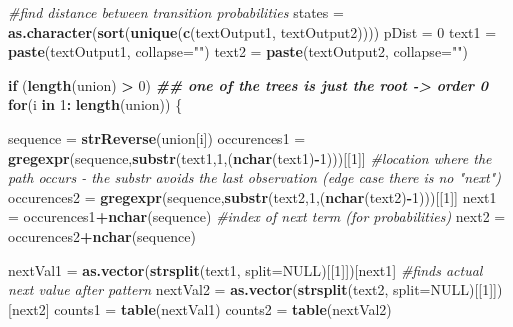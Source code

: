 \documentclass[
]{article}
\newenvironment{Shaded}{\begin{snugshade}}{\end{snugshade}}
\newcommand{\AttributeTok}[1]{\textcolor[rgb]{0.13,0.29,0.53}{#1}}
\newcommand{\CommentTok}[1]{\textcolor[rgb]{0.56,0.35,0.01}{\textit{#1}}}
\newcommand{\ConstantTok}[1]{\textcolor[rgb]{0.56,0.35,0.01}{#1}}
\newcommand{\ControlFlowTok}[1]{\textcolor[rgb]{0.13,0.29,0.53}{\textbf{#1}}}
\newcommand{\DecValTok}[1]{\textcolor[rgb]{0.00,0.00,0.81}{#1}}
\newcommand{\DocumentationTok}[1]{\textcolor[rgb]{0.56,0.35,0.01}{\textbf{\textit{#1}}}}
\newcommand{\FunctionTok}[1]{\textcolor[rgb]{0.13,0.29,0.53}{\textbf{#1}}}
\newcommand{\NormalTok}[1]{#1}
\newcommand{\OtherTok}[1]{\textcolor[rgb]{0.56,0.35,0.01}{#1}}
\newcommand{\SpecialCharTok}[1]{\textcolor[rgb]{0.81,0.36,0.00}{\textbf{#1}}}
\newcommand{\StringTok}[1]{\textcolor[rgb]{0.31,0.60,0.02}{#1}}
\begin{document}
\begin{Shaded}
\begin{Highlighting}[]
  \CommentTok{\#find distance between transition probabilities}
\NormalTok{  states }\OtherTok{=} \FunctionTok{as.character}\NormalTok{(}\FunctionTok{sort}\NormalTok{(}\FunctionTok{unique}\NormalTok{(}\FunctionTok{c}\NormalTok{(textOutput1, textOutput2))))}
\NormalTok{  pDist }\OtherTok{=} \DecValTok{0}
\NormalTok{  text1 }\OtherTok{=} \FunctionTok{paste}\NormalTok{(textOutput1, }\AttributeTok{collapse=}\StringTok{""}\NormalTok{)}
\NormalTok{  text2 }\OtherTok{=} \FunctionTok{paste}\NormalTok{(textOutput2, }\AttributeTok{collapse=}\StringTok{""}\NormalTok{)}
  
  \ControlFlowTok{if}\NormalTok{ (}\FunctionTok{length}\NormalTok{(union) }\SpecialCharTok{\textgreater{}} \DecValTok{0}\NormalTok{) }\DocumentationTok{\#\# one of the trees is just the root {-}\textgreater{} order 0}
    \ControlFlowTok{for}\NormalTok{(i }\ControlFlowTok{in} \DecValTok{1}\SpecialCharTok{:} \FunctionTok{length}\NormalTok{(union))}
\NormalTok{    \{}
      
\NormalTok{      sequence }\OtherTok{=} \FunctionTok{strReverse}\NormalTok{(union[i])}
\NormalTok{      occurences1 }\OtherTok{=} \FunctionTok{gregexpr}\NormalTok{(sequence,}\FunctionTok{substr}\NormalTok{(text1,}\DecValTok{1}\NormalTok{,(}\FunctionTok{nchar}\NormalTok{(text1)}\SpecialCharTok{{-}}\DecValTok{1}\NormalTok{)))[[}\DecValTok{1}\NormalTok{]] }\CommentTok{\#location where the path occurs  {-} the substr avoids the last observation (edge case there is no "next")}
\NormalTok{      occurences2 }\OtherTok{=} \FunctionTok{gregexpr}\NormalTok{(sequence,}\FunctionTok{substr}\NormalTok{(text2,}\DecValTok{1}\NormalTok{,(}\FunctionTok{nchar}\NormalTok{(text2)}\SpecialCharTok{{-}}\DecValTok{1}\NormalTok{)))[[}\DecValTok{1}\NormalTok{]]}
\NormalTok{      next1 }\OtherTok{=}\NormalTok{ occurences1}\SpecialCharTok{+}\FunctionTok{nchar}\NormalTok{(sequence) }\CommentTok{\#index of next term (for probabilities)}
\NormalTok{      next2 }\OtherTok{=}\NormalTok{ occurences2}\SpecialCharTok{+}\FunctionTok{nchar}\NormalTok{(sequence)}
      
      
      
\NormalTok{      nextVal1 }\OtherTok{=} \FunctionTok{as.vector}\NormalTok{(}\FunctionTok{strsplit}\NormalTok{(text1, }\AttributeTok{split=}\ConstantTok{NULL}\NormalTok{)[[}\DecValTok{1}\NormalTok{]])[next1] }\CommentTok{\#finds actual next value after pattern }
\NormalTok{      nextVal2 }\OtherTok{=} \FunctionTok{as.vector}\NormalTok{(}\FunctionTok{strsplit}\NormalTok{(text2, }\AttributeTok{split=}\ConstantTok{NULL}\NormalTok{)[[}\DecValTok{1}\NormalTok{]])[next2]}
\NormalTok{      counts1 }\OtherTok{=} \FunctionTok{table}\NormalTok{(nextVal1)}
\NormalTok{      counts2 }\OtherTok{=} \FunctionTok{table}\NormalTok{(nextVal2)     }
      

\end{Highlighting}
\end{Shaded}
\end{document}
